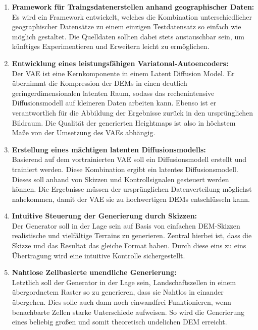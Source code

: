 \begin{enumerate}
    \item \textbf {Framework für Traingsdatenerstellen anhand geographischer Daten:} \\
    Es wird ein Framework entwickelt, welches die Kombination unterschiedlicher geographischer Datensätze zu einem einzigen Testdatensatz so einfach wie möglich gestaltet. Die Quelldaten sollten dabei stets austauschbar sein, um künftiges Experimentieren und Erweitern leicht zu ermöglichen.

    \item \textbf {Entwicklung eines leistungsfähigen Variatonal-Autoencoders:} \\
    Der \ac{VAE} ist eine Kernkomponente in einem Latent Diffusion Model. Er übernimmt die Kompression der \ac{DEM}s in einen deutlich geringerdimensionalen latenten Raum, sodass das rechenintensive Diffusionsmodell auf kleineren Daten arbeiten kann. Ebenso ist er verantwortlich für die Abbildung der Ergebnisse zurück in den ursprünglichen Bildraum. Die Qualität der generierten Heightmaps ist also in höchstem Maße von der Umsetzung des \ac{VAE}s abhängig.

    \item \textbf {Erstellung eines mächtigen latenten Diffusionsmodells:} \\
    Basierend auf dem vortrainierten \ac{VAE} soll ein Diffusionsmodell erstellt und trainiert werden. Diese Kombination ergibt ein latentes Diffusionsmodell. Dieses soll anhand von Skizzen und Kontrollsignalen gesteuert werden können. Die Ergebnisse müssen der ursprünglichen Datenverteilung möglichst nahekommen, damit der \ac{VAE} sie zu hochwertigen \ac{DEM}s entschlüsseln kann.
    
    \item \textbf {Intuitive Steuerung der Generierung durch Skizzen:} \\
    Der Generator soll in der Lage sein auf Basis von einfachen \ac{DEM}-Skizzen realistische und vielfältige Terrains zu generieren. Zentral hierbei ist, dass die Skizze und das Resultat das gleiche Format haben. Durch diese eins zu eins Übertragung wird eine intuitive Kontrolle sichergestellt.

    \item \textbf {Nahtlose Zellbasierte unendliche Generierung:} \\
    Letztlich soll der Generator in der Lage sein, Landschaftszellen in einem übergordnetem Raster so zu generieren, dass sie Nahtlos in einander übergehen. Dies solle auch dann noch einwandfrei Funktionieren, wenn benachbarte Zellen starke Unterschiede aufweisen. So wird die Generierung eines beliebig großen und somit theoretisch undelichen \ac{DEM} erreicht.
     
\end{enumerate}


